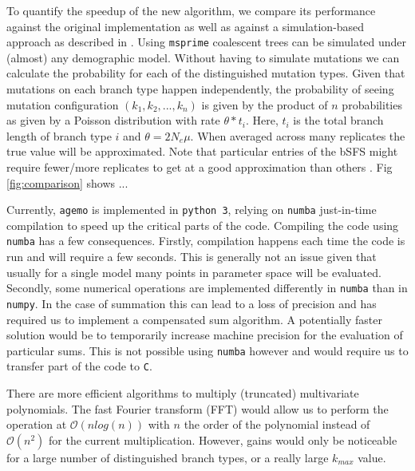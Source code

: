 \documentclass[10pt, a4]{article}
\begin{document}
To quantify the speedup of the new algorithm, we compare its performance against the original implementation \citep{Lohse2011} as well as against a simulation-based approach as described in \citet{Beeravolu2018}. Using \texttt{msprime} \citep{Baumdicker2021} coalescent trees can be simulated under (almost) any demographic model. Without having to simulate mutations we can calculate the probability for each of the distinguished mutation types. Given that mutations on each branch type happen independently, the probability of seeing mutation configuration $(k_1, k_2, ..., k_n)$ is given by the product of $n$ probabilities as given by a Poisson distribution with rate $\theta * t_i$. Here, $t_i$ is the total branch length of branch type $i$ and $\theta=2N_e\mu$. When averaged across many replicates the true value will be approximated. Note that particular entries of the bSFS might require fewer/more replicates to get at a good approximation than others \citep{Beeravolu2018}.  
Fig \ref{fig:comparison} shows ... %

Currently, \texttt{agemo} is implemented in \texttt{python 3}, relying on \texttt{numba} just-in-time compilation to speed up the critical parts of the code. Compiling the code using \texttt{numba} has a few consequences. Firstly, compilation happens each time the code is run and will require a few seconds. This is generally not an issue given that usually for a single model many points in parameter space will be evaluated. Secondly, some numerical operations are implemented differently in \texttt{numba} than in \texttt{numpy}. In the case of summation this can lead to a loss of precision and has required us to implement a compensated sum algorithm. A potentially faster solution would be to temporarily increase machine precision for the evaluation of particular sums. This is not possible using \texttt{numba} however and would require us to transfer part of the code to \texttt{C}. 

There are more efficient algorithms to multiply (truncated) multivariate polynomials. The fast Fourier transform (FFT) would allow us to perform the operation at $\mathcal{O}(n log(n))$ with $n$ the order of the polynomial instead of $\mathcal{O}(n^2)$ for the current multiplication. However, gains would only be noticeable for a large number of distinguished branch types, or a really large $k_{max}$ value. 
\newline
\end{document}
